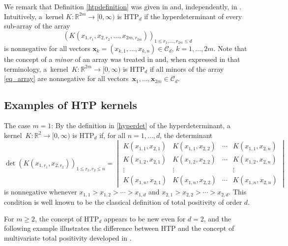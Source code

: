 \documentclass[10pt,a4paper]{amsart}
\numberwithin{equation}{section}
\def\R{{\mathbb R}}
\def\CC{\mathcal{C}}
\def\xx{\boldsymbol{x}}
\begin{document}
We remark that Definition \ref{htpdefinition} was given in \cite{Johnson_Richards} and, independently, in \cite{wanglixu}. Intuitively, a~kernel $K\colon\R^{2m} \to [0,\infty)$ is HTP$_d$ if the hyperdeterminant of every sub-array of the array
\begin{equation}
\label{eq_array}
(K(x_{1,r_1},x_{2,r_2},\dots,x_{2m,r_{2m}}))_{1 \le r_1,\dots,r_{2m} \le d}
\end{equation}
is nonnegative for all vectors $\xx_k = (x_{k,1},\dots,x_{k,n}) \in \CC_d$, $k=1,\dots,2m$. Note that the concept of a {\it minor} of an array was treated in \cite{boussicault} and, when expressed in that terminology, a~kernel~${K\colon\R^{2m} \to [0,\infty)}$ is HTP$_d$ if all minors of the array \eqref{eq_array} are nonnegative for all vectors~${\xx_1,\dots,\xx_{2m} \in \CC_d}$.





\subsection{Examples of HTP kernels}

\begin{Example}
\label{classicaltp}
The case $m = 1$: By the definition in \eqref{hyperdet} of the hyperdeterminant, a kernel~${K\colon \R^2 \to [0,\infty)}$ is HTP$_d$ if, for all $n = 1,\dots,d$, the determinant
\[
\det(K(x_{1,r_1},x_{2,r_2}))_{1 \le r_1,r_2 \le n} =
\begin{vmatrix}
K(x_{1,1},x_{2,1}) & K(x_{1,1},x_{2,2}) & \cdots & K(x_{1,1},x_{2,n}) \\
K(x_{1,2},x_{2,1}) & K(x_{1,2},x_{2,2}) & \cdots & K(x_{1,2},x_{2,n}) \\
\vdots & \vdots & & \vdots \\
K(x_{1,n},x_{2,1}) & K(x_{1,n},x_{2,2}) & \cdots & K(x_{1,n},x_{2,n})
\end{vmatrix}
\]
is nonnegative whenever $x_{1,1} > x_{1,2} > \cdots > x_{1,d}$ and $x_{2,1} > x_{2,2} > \cdots > x_{2,d}$. This condition is well known to be the classical definition of total positivity of order $d$.
\end{Example}

For $m \ge 2$, the concept of HTP$_d$ appears to be new even for $d=2$, and the following example illustrates the difference between HTP and the concept of multivariate total positivity developed in \cite{karlinrinott80}.
\end{document}

